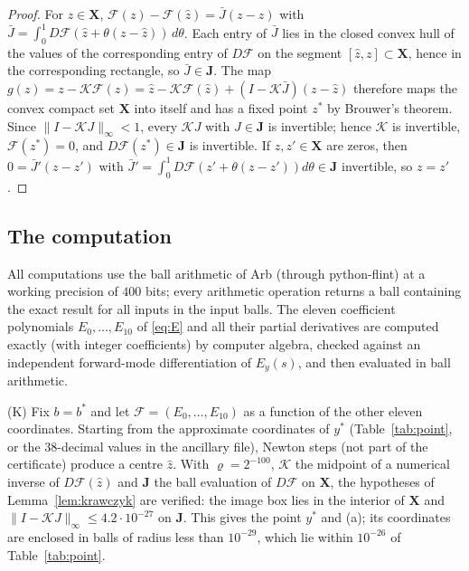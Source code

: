 \documentclass[11pt]{amsart}
\theoremstyle{definition}
\theoremstyle{remark}
\numberwithin{equation}{section}
\begin{document}
\begin{proof}
For $z\in\mathbf X$, $\mathcal F(z)-\mathcal F(\hat z)=\bar J(z-\hat z)$ with $\bar J=\int_0^1D\mathcal F(\hat z+\theta(z-\hat z))\,d\theta$. Each entry of $\bar J$ lies in the closed convex hull of the values of the corresponding entry of $D\mathcal F$ on the segment $[\hat z,z]\subset\mathbf X$, hence in the corresponding rectangle, so $\bar J\in\mathbf J$. The map $g(z)=z-\mathcal K\mathcal F(z)=\hat z-\mathcal K\mathcal F(\hat z)+(I-\mathcal K\bar J)(z-\hat z)$ therefore maps the convex compact set $\mathbf X$ into itself and has a fixed point $z^*$ by Brouwer's theorem. Since $\|I-\mathcal KJ\|_\infty<1$, every $\mathcal KJ$ with $J\in\mathbf J$ is invertible; hence $\mathcal K$ is invertible, $\mathcal F(z^*)=0$, and $D\mathcal F(z^*)\in\mathbf J$ is invertible. If $z,z'\in\mathbf X$ are zeros, then $0=\bar J'(z-z')$ with $\bar J'=\int_0^1D\mathcal F(z'+\theta(z-z'))d\theta\in\mathbf J$ invertible, so $z=z'$.
\end{proof}

\subsection{The computation}\label{subsec:computation}
All computations use the ball arithmetic of Arb \cite{Jo17} (through python-flint) at a working precision of $400$ bits; every arithmetic operation returns a ball containing the exact result for all inputs in the input balls. The eleven coefficient polynomials $E_0,\dots,E_{10}$ of \eqref{eq:E} and all their partial derivatives are computed exactly (with integer coefficients) by computer algebra, checked against an independent forward-mode differentiation of $E_y(s)$, and then evaluated in ball arithmetic.

(K) Fix $b=b^*$ and let $\mathcal F=(E_0,\dots,E_{10})$ as a function of the other eleven coordinates. Starting from the approximate coordinates of $y^*$ (Table~\ref{tab:point}, or the $38$-decimal values in the ancillary file), Newton steps (not part of the certificate) produce a centre $\hat z$. With $\varrho=2^{-100}$, $\mathcal K$ the midpoint of a numerical inverse of $D\mathcal F(\hat z)$ and $\mathbf J$ the ball evaluation of $D\mathcal F$ on $\mathbf X$, the hypotheses of Lemma~\ref{lem:krawczyk} are verified: the image box lies in the interior of $\mathbf X$ and $\|I-\mathcal KJ\|_\infty\le4.2\cdot10^{-27}$ on $\mathbf J$. This gives the point $y^*$ and (a); its coordinates are enclosed in balls of radius less than $10^{-29}$, which lie within $10^{-26}$ of Table~\ref{tab:point}.
\end{document}
